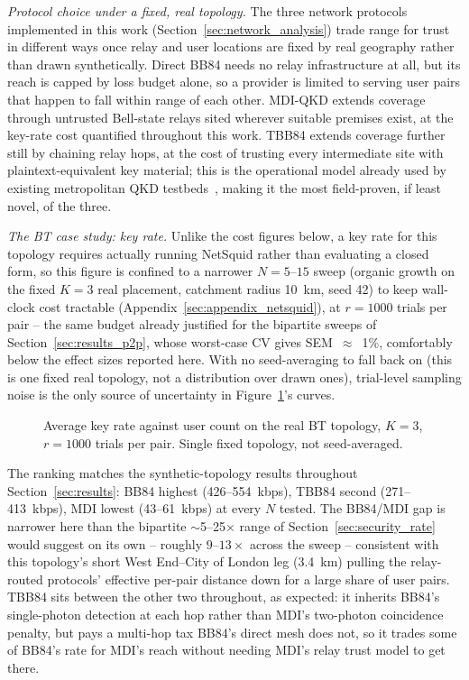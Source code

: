 \documentclass[12pt]{article}
\begin{document}
\textit{Protocol choice under a fixed, real topology.} The three network protocols implemented in this work (Section~\ref{sec:network_analysis}) trade range for trust in different ways once relay and user locations are fixed by real geography rather than drawn synthetically. Direct BB84 needs no relay infrastructure at all, but its reach is capped by loss budget alone, so a provider is limited to serving user pairs that happen to fall within range of each other. MDI-QKD extends coverage through untrusted Bell-state relays sited wherever suitable premises exist, at the key-rate cost quantified throughout this work. TBB84 extends coverage further still by chaining relay hops, at the cost of trusting every intermediate site with plaintext-equivalent key material; this is the operational model already used by existing metropolitan QKD testbeds~\cite{Elliott_2002,Peev_2009,chen2021}, making it the most field-proven, if least novel, of the three.

\textit{The BT case study: key rate.} Unlike the cost figures below, a key rate for this topology requires actually running NetSquid rather than evaluating a closed form, so this figure is confined to a narrower $N=5$--$15$ sweep (organic growth on the fixed $K=3$ real placement, catchment radius 10~km, seed 42) to keep wall-clock cost tractable (Appendix~\ref{sec:appendix_netsquid}), at $r=1000$ trials per pair -- the same budget already justified for the bipartite sweeps of Section~\ref{sec:results_p2p}, whose worst-case CV gives SEM~$\approx$~1\%, comfortably below the effect sizes reported here. With no seed-averaging to fall back on (this is one fixed real topology, not a distribution over drawn ones), trial-level sampling noise is the only source of uncertainty in Figure~\ref{fig:bt_key_rate}'s curves.

\begin{figure}[hbtp]
    \centering
    
    \caption{Average key rate against user count on the real BT topology, $K=3$, $r=1000$ trials per pair. Single fixed topology, not seed-averaged.}
    \label{fig:bt_key_rate}
\end{figure}

The ranking matches the synthetic-topology results throughout Section~\ref{sec:results}: BB84 highest (426--554~kbps), TBB84 second (271--413~kbps), MDI lowest (43--61~kbps) at every $N$ tested. The BB84/MDI gap is narrower here than the bipartite $\sim$5--25$\times$ range of Section~\ref{sec:security_rate} would suggest on its own -- roughly $9$--$13\times$ across the sweep -- consistent with this topology's short West End--City of London leg (3.4~km) pulling the relay-routed protocols' effective per-pair distance down for a large share of user pairs. TBB84 sits between the other two throughout, as expected: it inherits BB84's single-photon detection at each hop rather than MDI's two-photon coincidence penalty, but pays a multi-hop tax BB84's direct mesh does not, so it trades some of BB84's rate for MDI's reach without needing MDI's relay trust model to get there.
\end{document}
